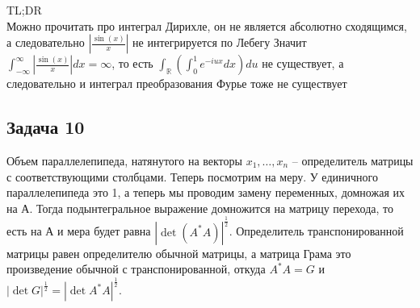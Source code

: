 	\vskip 0.1in
	TL;DR\\
	Можно прочитать про интеграл Дирихле, он не является абсолютно сходящимся, а следовательно $\left|\frac{\sin(x)}{x}\right|$ не интегрируется по Лебегу
	\vskip 0.2in
	Значит $\int_{-\infty}^{\infty} \left|\frac{\sin(x)}{x}\right| dx = \infty$, то есть $\int_{\mathbb{R}} \left(\int_{0}^{1} e^{-iux} dx\right) du$ не существует, а следовательно и интеграл преобразования Фурье тоже не существует
\vskip 0.4in

\begin{comment}
\begin{gather*}	
A = [0,1]^2\\
I_A = 
\begin{cases}
1\quad (x,y) \in A\\
0\quad (x,y) \notin A
\end{cases}\qquad \text{ в } \mathbb{R}^2\\
I_A = I_x I_y\qquad x = [0,1]\in O_x\quad y = [0,1]\in O_y
\hat{f}(\lambda, \mu) = 
\iint_{\mathbb{R}^2} e^{-i \lambda x - i \mu y} I_A dxdy =
\int_{\mathbb{R}} e^{-i \lambda x} I_x dx \int_{\mathbb{R}} e^{-i \mu y} I_y dy\\
\sin(x) = \frac{e^{ix} - e^{-ix}}{2i}\\
\cos(x) = \frac{e^{ix} + e^{-ix}}{2}\\
\int_{\mathbb{R}} e^{-i \lambda x} I_x dx = 
\int_{-\infty}^{0} e^{-i \lambda x} I_x dx + \int_{0}^{1} e^{-i \lambda x} I_x dx + \int_{1}^{\infty} e^{-i \lambda x} I_x dx =\\
\int_{0}^{1} e^{-i \lambda x} dx = 
\frac{1}{-i \lambda} e^{-i \lambda x} \bigg|_{0}^{1} =
\frac{e^{-i \lambda} - 1}{-i \lambda} \text{ интегрируемо }\\
\hat{f}(\lambda, \mu) = \frac{(e^{-i \lambda} - 1)(e^{-i \mu} - 1)}{\lambda \mu}
\end{gather*}
\end{comment}

\subsection*{Задача 10}
	Объем параллелепипеда, натянутого на векторы $x_1, \ldots, x_n$ -- определитель матрицы с соответствующими столбцами. Теперь посмотрим на меру. У единичного параллелепипеда это 1, а теперь мы проводим замену переменных, домножая их на А. Тогда подынтегральное выражение домножится на матрицу перехода, то есть на А и мера будет равна $|\det(A^* A)|^{\frac{1}{2}}$. Определитель транспонированной матрицы равен определителю обычной матрицы, а матрица Грама это произведение обычной с транспонированной, откуда $A^* A = G$ и $|\det G|^{\frac{1}{2}} = |\det A^* A|^{\frac{1}{2}}$.
\begin{comment}
При умножении базисных векторов на $A$, параллелепипед будет иметь меру $\det A$. При замене координат происходит то же самое (подынтегральное выражение умножится на определитель матрицы переход $\det A$), осталось заметить, что $\det A = \det A^t$ и $\det G = \det A^t \cdot \det A$
\end{comment}
